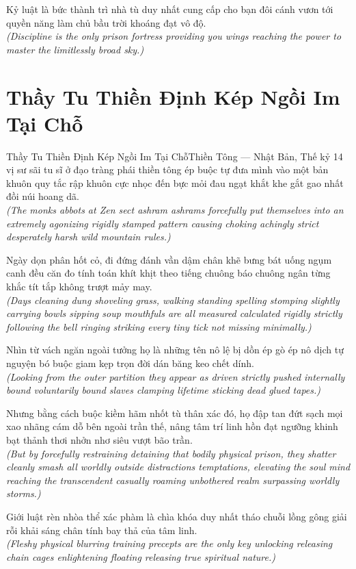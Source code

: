\begin{baihoc}
  Kỷ luật là bức thành trì nhà tù duy nhất cung cấp cho bạn đôi cánh vươn tới quyền năng làm chủ bầu trời khoáng đạt vô độ.\\[4pt]
  \textit{(Discipline is the only prison fortress providing you wings reaching the power to master the limitlessly broad sky.)}
\end{baihoc}

\section{Thầy Tu Thiền Định Kép Ngồi Im Tại Chỗ}
\begin{truyen}{Thầy Tu Thiền Định Kép Ngồi Im Tại Chỗ}{Thiền Tông --- Nhật Bản, Thế kỷ 14}
 vị sư sãi tu sĩ ở đạo tràng phái thiền tông ép buộc tự đưa mình vào một bản khuôn quy tắc rập khuôn cực nhọc đến bực mỏi đau ngạt khắt khe gắt gao nhất đồi núi hoang dã.\\[4pt]
\textit{(The monks abbots at Zen sect ashram ashrams forcefully put themselves into an extremely agonizing rigidly stamped pattern causing choking achingly strict desperately harsh wild mountain rules.)}

Ngày dọn phân hốt cỏ, đi đứng đánh vần dậm chân khẽ bưng bát uống ngụm canh đều căn đo tính toán khít khịt theo tiếng chuông báo chuông ngân từng khắc tít tắp không trượt mảy may.\\[4pt]
\textit{(Days cleaning dung shoveling grass, walking standing spelling stomping slightly carrying bowls sipping soup mouthfuls are all measured calculated rigidly strictly following the bell ringing striking every tiny tick not missing minimally.)}

Nhìn từ vách ngăn ngoài tưởng họ là những tên nô lệ bị dồn ép gò ép nô dịch tự nguyện bó buộc giam kẹp trọn đời dán băng keo chết dính.\\[4pt]
\textit{(Looking from the outer partition they appear as driven strictly pushed internally bound voluntarily bound slaves clamping lifetime sticking dead glued tapes.)}

Nhưng bằng cách buộc kiềm hãm nhốt tù thân xác đó, họ đập tan đứt sạch mọi xao nhãng cám dỗ bên ngoài trần thế, nâng tâm trí linh hồn đạt ngưỡng khinh bạt thảnh thơi nhởn nhơ siêu vượt bão trần.\\[4pt]
\textit{(But by forcefully restraining detaining that bodily physical prison, they shatter cleanly smash all worldly outside distractions temptations, elevating the soul mind reaching the transcendent casually roaming unbothered realm surpassing worldly storms.)}

\end{truyen}
\begin{baihoc}
  Giới luật rèn nhòa thể xác phàm là chìa khóa duy nhất tháo chuỗi lồng gông giải rỗi khải sáng chân tính bay thả của tâm linh.\\[4pt]
  \textit{(Fleshy physical blurring training precepts are the only key unlocking releasing chain cages enlightening floating releasing true spiritual nature.)}
\end{baihoc}

